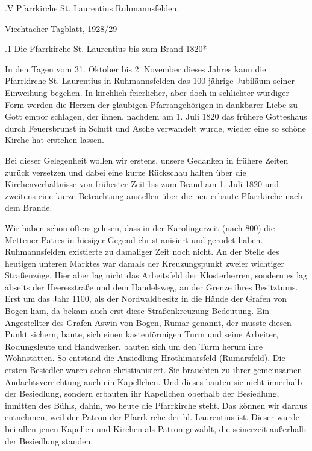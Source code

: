 \documentclass{book}
\begin{document}
.V Pfarrkirche St. Laurentius Ruhmannsfelden,

Viechtacher Tagblatt, 1928/29

.1 Die Pfarrkirche St. Laurentius bis zum Brand 1820*

In den Tagen vom 31. Oktober bis 2. November dieses Jahres kann die Pfarrkirche
St. Laurentius in Ruhmannsfelden das 100-jährige Jubiläum seiner Einweihung
begehen. In kirchlich feierlicher, aber doch in schlichter würdiger Form werden
die Herzen der gläubigen Pfarrangehörigen in dankbarer Liebe zu Gott empor
schlagen, der ihnen, nachdem am 1. Juli 1820 das frühere Gotteshaus durch
Feuersbrunst in Schutt und Asche verwandelt wurde, wieder eine so schöne Kirche
hat erstehen lassen.

Bei dieser Gelegenheit wollen wir erstens, unsere Gedanken in frühere Zeiten
zurück versetzen und dabei eine kurze Rückschau halten über die
Kirchenverhältnisse von frühester Zeit bis zum Brand am 1. Juli 1820 und
zweitens eine kurze Betrachtung anstellen über die neu erbaute Pfarrkirche nach
dem Brande.

Wir haben schon öfters gelesen, dass in der Karolingerzeit (nach 800) die
Mettener Patres in hiesiger Gegend christianisiert und gerodet haben.
Ruhmannsfelden existierte zu damaliger Zeit noch nicht. An der Stelle des
heutigen unteren Marktes war damals der Kreuzungspunkt zweier wichtiger
Straßenzüge. Hier aber lag nicht das Arbeitsfeld der Klosterherren, sondern es
lag abseits der Heeresstraße und dem Handelsweg, an der Grenze ihres Besitztums.
Erst um das Jahr 1100, als der Nordwaldbesitz in die Hände der Grafen von Bogen
kam, da bekam auch erst diese Straßenkreuzung Bedeutung. Ein Angestellter des
Grafen Aswin von Bogen, Rumar genannt, der musste diesen Punkt sichern, baute,
sich einen kastenförmigen Turm und seine Arbeiter, Rodungsleute und Handwerker,
bauten sich um den Turm herum ihre Wohnstätten. So entstand die Ansiedlung
Hrothimarsfeld (Rumarsfeld). Die ersten Besiedler waren schon christianisiert.
Sie brauchten zu ihrer gemeinsamen Andachtsverrichtung auch ein Kapellchen. Und
dieses bauten sie nicht innerhalb der Besiedlung, sondern erbauten ihr
Kapellchen oberhalb der Besiedlung, inmitten des Bühls, dahin, wo heute die
Pfarrkirche steht. Das können wir daraus entnehmen, weil der Patron der
Pfarrkirche der hl. Laurentius ist. Dieser wurde bei allen jenen Kapellen und
Kirchen als Patron gewählt, die seinerzeit außerhalb der Besiedlung standen.
\end{document}
